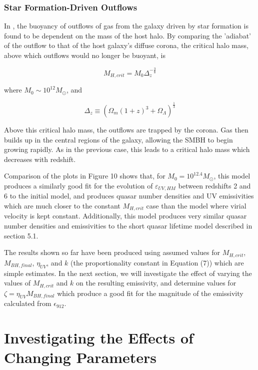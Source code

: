 \documentclass[12pt]{article}%
\begin{document}
\subsubsection{Star Formation-Driven Outflows}

In \cite{Quasar}, the buoyancy of outflows of gas from the galaxy driven by star formation is found to be dependent on the mass of the host halo. By comparing the 'adiabat' of the outflow to that of the host galaxy's diffuse corona, the critical halo mass, above which outflows would no longer be buoyant, is

\begin{equation}
    M_{H,crit}=M_0\Delta_z^{-\frac{3}{8}}
\end{equation}

\noindent where $M_0\sim10^{12}M_\odot$, and

\begin{equation}
    \Delta_z\equiv(\Omega_m(1+z)^3+\Omega_\Lambda)^{\frac{1}{3}}
\end{equation}

\noindent Above this critical halo mass, the outflows are trapped by the corona. Gas then builds up in the central regions of the galaxy, allowing the SMBH to begin growing rapidly. As in the previous case, this leads to a critical halo mass which decreases with redshift.\par

Comparison of the plots in Figure 10 shows that, for $M_0=10^{12.4}M_\odot$, this model produces a similarly good fit for the evolution of $\varepsilon_{UV,HM}$ between redshifts 2 and 6 to the initial model, and produces quasar number densities and UV emissivities which are much closer to the constant $M_{H,crit}$ case than the model where virial velocity is kept constant. Additionally, this model produces very similar quasar number densities and emissivities to the short quasar lifetime model described in section 5.1.

 The results shown so far have been produced using assumed values for $M_{H,crit}$, $M_{BH,final}$, $\eta_{UV}$, and $k$ (the proportionality constant in Equation (7)) which are simple estimates. In the next section, we will investigate the effect of varying the values of $M_{H,crit}$ and $k$ on the resulting emissivity, and determine values for $\zeta=\eta_{UV}M_{BH,final}$ which produce a good fit for the magnitude of the emissivity calculated from $\epsilon_{912}$.

\section{Investigating the Effects of Changing Parameters}
\end{document}
